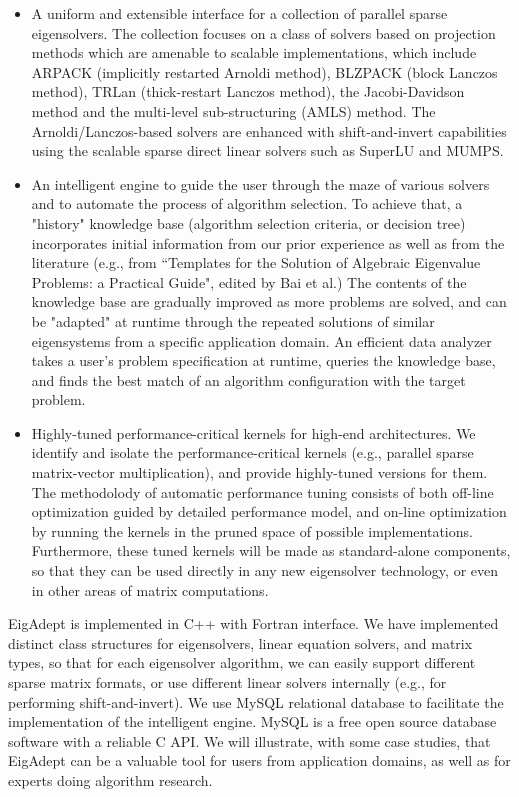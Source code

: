 \documentclass{report}
\begin{document}
\begin{itemize}

\item A uniform and extensible interface for a collection of parallel
sparse eigensolvers. The collection focuses on a class of solvers based on
projection methods which are amenable to scalable implementations,
which include ARPACK (implicitly restarted Arnoldi method),
BLZPACK (block Lanczos method), TRLan (thick-restart Lanczos method),
the Jacobi-Davidson method and the multi-level sub-structuring (AMLS) method.
The Arnoldi/Lanczos-based solvers are enhanced with shift-and-invert
capabilities using the scalable sparse direct linear solvers such as
SuperLU and MUMPS.

\item An intelligent engine to guide the user through the maze of various
solvers and to automate the process of algorithm selection. To achieve that,
a "history" knowledge base (algorithm selection criteria, or decision tree)
incorporates initial information from our prior experience as well as from
the literature (e.g., from ``Templates for the Solution of Algebraic
Eigenvalue Problems: a Practical Guide", edited by Bai et al.) The contents
of the knowledge base are gradually improved as more problems are solved,
and can be "adapted" at runtime through the repeated solutions of similar
eigensystems from a specific application domain. An efficient data analyzer
takes a user's problem specification at runtime, queries the knowledge base,
and finds the best match of an algorithm configuration with the target
problem.

\item Highly-tuned performance-critical kernels for high-end architectures.
We identify and isolate the performance-critical kernels (e.g., parallel
sparse matrix-vector multiplication), and provide highly-tuned versions for
them. The methodolody of automatic performance tuning consists of both
off-line optimization guided by detailed performance model, and on-line
optimization by running the kernels in the pruned space of possible
implementations. Furthermore, these tuned kernels will be made as
standard-alone components, so that they can be used directly in any new
eigensolver technology, or even in other areas of matrix computations.
\end{itemize}

EigAdept is implemented in C++ with Fortran interface. We have implemented
distinct class structures for eigensolvers, linear equation solvers,
and matrix types, so that for each eigensolver algorithm, we can easily
support different sparse matrix formats, or use different linear solvers
internally (e.g., for performing shift-and-invert). We use MySQL relational
database to facilitate the implementation of the intelligent engine. MySQL
is a free open source database software with a reliable C API. We will
illustrate, with some case studies, that EigAdept can be a valuable tool
for users from application domains, as well as for experts doing
algorithm research.
\end{document}
